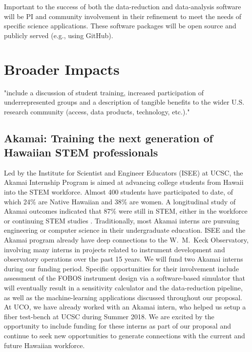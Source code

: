 \documentclass[oneside,11pt]{amsart}
\begin{document}
Important to the success of both the data-reduction and data-analysis
software will be PI and community involvement in their refinement to
meet the needs of specific science applications.  These software
packages will be open source and publicly served (e.g., using GitHub).


\section{Broader Impacts}
\label{sec:bi}

"include a discussion of student training, increased participation of
underrepresented groups and a description of tangible benefits to the
wider U.S. research community (access, data products, technology,
etc.)."

\subsection{Akamai: Training the next generation of Hawaiian STEM
professionals} Led by the Institute for Scientist and Engineer Educators
(ISEE) at UCSC, the Akamai Internship Program is aimed at advancing
college students from Hawaii into the STEM workforce.  Almost 400
students have participated to date, of which 24\% are Native Hawaiian
and 38\% are women. A longitudinal study of Akamai outcomes indicated
that 87\% were still in STEM, either in the workforce or continuing STEM
studies \citep{asee_peer_31030}.  Traditionally, most Akamai interns are
pursuing engineering or computer science in their undergraduate
education.  ISEE and the Akamai program already have deep connections to
the W.~M.~Keck Observatory, involving many interns in projects related
to instrument development and observatory operations over the past 15
years.  We will fund two Akamai interns during our funding period.
Specific opportunities for their involvement include assessment of the
FOBOS instrument design via a software-based simulator that will
eventually result in a sensitivity calculator and the data-reduction
pipeline, as well as the machine-learning applications discussed
throughout our proposal.  At UCO, we have already worked with an Akamai
intern, who helped us setup a fiber test-bench at UCSC during Summer
2018. We are excited by the opportunity to include funding for these
interns as part of our proposal and continue to seek new opportunities
to generate connections with the current and future Hawaiian workforce.
\end{document}
